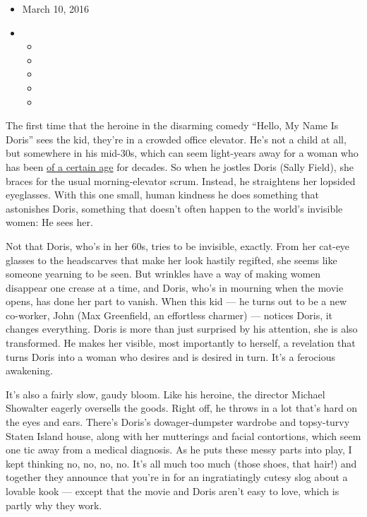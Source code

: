 \begin{itemize}
\item
  March 10, 2016
\item
  \begin{itemize}
  \item
  \item
  \item
  \item
  \item
  \end{itemize}
\end{itemize}

The first time that the heroine in the disarming comedy ``Hello, My Name
Is Doris'' sees the kid, they're in a crowded office elevator. He's not
a child at all, but somewhere in his mid-30s, which can seem light-years
away for a woman who has been
\href{http://www.nytimes.com/1995/07/02/magazine/in-language-a-woman-of-a-certain-age.html}{of
a certain age} for decades. So when he jostles Doris (Sally Field), she
braces for the usual morning-elevator scrum. Instead, he straightens her
lopsided eyeglasses. With this one small, human kindness he does
something that astonishes Doris, something that doesn't often happen to
the world's invisible women: He sees her.

Not that Doris, who's in her 60s, tries to be invisible, exactly. From
her cat-eye glasses to the headscarves that make her look hastily
regifted, she seems like someone yearning to be seen. But wrinkles have
a way of making women disappear one crease at a time, and Doris, who's
in mourning when the movie opens, has done her part to vanish. When this
kid --- he turns out to be a new co-worker, John (Max Greenfield, an
effortless charmer) --- notices Doris, it changes everything. Doris is
more than just surprised by his attention, she is also transformed. He
makes her visible, most importantly to herself, a revelation that turns
Doris into a woman who desires and is desired in turn. It's a ferocious
awakening.

It's also a fairly slow, gaudy bloom. Like his heroine, the director
Michael Showalter eagerly oversells the goods. Right off, he throws in a
lot that's hard on the eyes and ears. There's Doris's dowager-dumpster
wardrobe and topsy-turvy Staten Island house, along with her mutterings
and facial contortions, which seem one tic away from a medical
diagnosis. As he puts these messy parts into play, I kept thinking no,
no, no, no. It's all much too much (those shoes, that hair!) and
together they announce that you're in for an ingratiatingly cutesy slog
about a lovable kook --- except that the movie and Doris aren't easy to
love, which is partly why they work.

